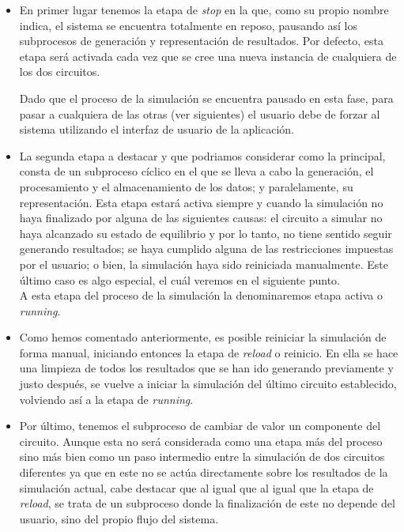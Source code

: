 \documentclass[../main.tex]{subfiles}
\begin{document}
\begin{itemize}
    \item En primer lugar tenemos la etapa de \textit{stop} en la que, como su propio nombre indica, el sistema se encuentra totalmente en reposo, pausando así los subprocesos de generación y representación de resultados. Por defecto, esta etapa será activada cada vez que se cree una nueva instancia de cualquiera de los dos circuitos. 

    Dado que el proceso de la simulación se encuentra pausado en esta fase, para pasar a cualquiera de las otras (ver siguientes) el usuario debe de forzar al sistema utilizando el interfaz de usuario de la aplicación.

    \item La segunda etapa a destacar y que podriamos considerar como la principal, consta de un subproceso cíclico en el que se lleva a cabo la generación, el procesamiento y el almacenamiento de los datos; y paralelamente, su representación. Esta etapa estará activa siempre y cuando la simulación no haya finalizado por alguna de las siguientes causas: el circuito a simular no haya alcanzado su estado de equilibrio y por lo tanto, no tiene sentido seguir generando resultados; se haya cumplido alguna de las restricciones impuestas por el usuario; o bien, la simulación haya sido reiniciada manualmente. Este último caso es algo especial, el cuál veremos en el siguiente punto. \\

    A esta etapa del proceso de la simulación la denominaremos etapa activa o \textit{running}.

    \item Como hemos comentado anteriormente, es posible reiniciar la simulación de forma manual, iniciando entonces la etapa de \textit{reload} o reinicio. En ella se hace una limpieza de todos los resultados que se han ido generando previamente y justo después, se vuelve a iniciar la simulación del último circuito establecido, volviendo así a la etapa de \textit{running}. 

    \item Por último, tenemos el subproceso de cambiar de valor un componente del circuito. Aunque esta no será considerada como una etapa más del proceso sino más bien como un paso intermedio entre la  
    simulación de dos circuitos diferentes ya que en este no se actúa directamente sobre los resultados de la simulación actual, cabe destacar que al igual que al igual que la etapa de \textit{reload}, se trata de un subproceso donde la finalización de este no depende del usuario, sino del propio flujo del sistema. 
    
   
\end{itemize}
\end{document}
